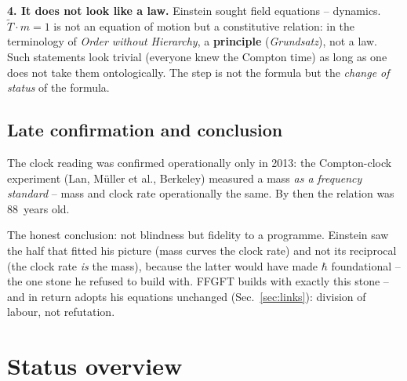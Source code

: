 \documentclass[11pt]{report}
\begin{document}
\textbf{4. It does not look like a law.} Einstein sought field
equations -- dynamics. $\tilde T \cdot m = 1$ is not an equation of
motion but a constitutive relation: in the terminology of
\emph{Order without Hierarchy}, a \textbf{principle}
(\emph{Grundsatz}), not a law. Such statements look trivial
(everyone knew the Compton time) as long as one does not take them
ontologically. The step is not the formula but the \emph{change of
status} of the formula.

\section{Late confirmation and conclusion}

The clock reading was confirmed operationally only in 2013: the
Compton-clock experiment (Lan, Müller et al., Berkeley) measured a
mass \emph{as a frequency standard} -- mass and clock rate
operationally the same. By then the relation was 88~years old.

The honest conclusion: not blindness but fidelity to a programme.
Einstein saw the half that fitted his picture (mass curves the
clock rate) and not its reciprocal (the clock rate \emph{is} the
mass), because the latter would have made $\hbar$ foundational --
the one stone he refused to build with. FFGFT builds with exactly
this stone -- and in return adopts his equations unchanged
(Sec.~\ref{sec:links}): division of labour, not refutation.

\chapter{Status overview}
\end{document}

